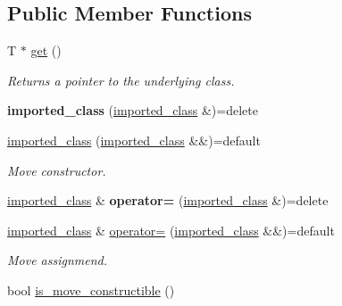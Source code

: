 \subsection*{Public Member Functions}
\begin{DoxyCompactItemize}
\item 
T $\ast$ \hyperlink{a00155_a6605491bba4a2f25af7d7dbb86855524}{get} ()\hypertarget{a00155_a6605491bba4a2f25af7d7dbb86855524}{}\label{a00155_a6605491bba4a2f25af7d7dbb86855524}

\begin{DoxyCompactList}\small\item\em Returns a pointer to the underlying class. \end{DoxyCompactList}\item 
{\bfseries imported\+\_\+class} (\hyperlink{a00155}{imported\+\_\+class} \&)=delete\hypertarget{a00155_adf0748e828a8fc810b721b017735dbbb}{}\label{a00155_adf0748e828a8fc810b721b017735dbbb}

\item 
\hyperlink{a00155_abdd658355cf8bdd782138525420a794c}{imported\+\_\+class} (\hyperlink{a00155}{imported\+\_\+class} \&\&)=default\hypertarget{a00155_abdd658355cf8bdd782138525420a794c}{}\label{a00155_abdd658355cf8bdd782138525420a794c}

\begin{DoxyCompactList}\small\item\em Move constructor. \end{DoxyCompactList}\item 
\hyperlink{a00155}{imported\+\_\+class} \& {\bfseries operator=} (\hyperlink{a00155}{imported\+\_\+class} \&)=delete\hypertarget{a00155_a100fea6a169061c64a84d584c81f947f}{}\label{a00155_a100fea6a169061c64a84d584c81f947f}

\item 
\hyperlink{a00155}{imported\+\_\+class} \& \hyperlink{a00155_a0a3936704be3249f7bce69e24e230626}{operator=} (\hyperlink{a00155}{imported\+\_\+class} \&\&)=default\hypertarget{a00155_a0a3936704be3249f7bce69e24e230626}{}\label{a00155_a0a3936704be3249f7bce69e24e230626}

\begin{DoxyCompactList}\small\item\em Move assignmend. \end{DoxyCompactList}\item 
bool \hyperlink{a00155_a8609448b6dc64a623863793d6dedde75}{is\+\_\+move\+\_\+constructible} ()\hypertarget{a00155_a8609448b6dc64a623863793d6dedde75}{}\label{a00155_a8609448b6dc64a623863793d6dedde75}


\end{DoxyCompactItemize}
